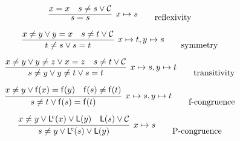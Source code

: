 \begin{gather*}
	\infer[x\mapsto s]
	{{ s=s} 
		}
	{x = x & s\neq s \lor \mcC } 
	\tag*{reflexivity}
	\\[0.5em]
	\infer[x\mapsto t, y\mapsto s]
	{t\neq s \lor s=t}
	{x\neq y\lor y=x & s\neq t \lor \mcC}
	\tag*{symmetry}
	\\[0.5em]
	\infer[x\mapsto s, y\mapsto t]
	{s\neq y \lor y \neq t \lor s = t}
	{x\neq y \lor y\neq z \lor x = z & s \neq t \lor \mcC}
	\tag*{transitivity}
	\\[0.5em]
	\infer[x\mapsto s,y\mapsto t]
	{s \neq t \lor \mf(s) = \mf(t)}
	{x\neq y \lor \mf(x) = \mf(y) & \mf(s)\neq \mf(t)}
	\tag*{f-congruence}
	\\[0.5em]
	\infer[x \mapsto s]
	{s \neq y \lor \mL^{\!c}(s) \lor \mL(y)}
	{x \neq y \lor \mL^{\!c}(x) \lor \mL(y) & {\mL(s)} \lor \mcC}
	\tag*{P-congruence}
\end{gather*}